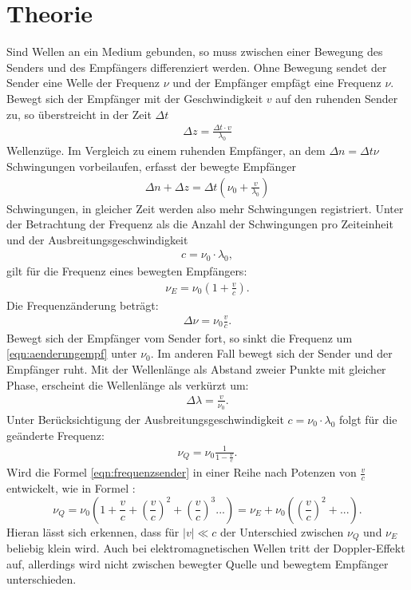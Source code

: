\section{Theorie}
\label{sec:Theorie}
Sind Wellen an ein Medium gebunden,
so muss zwischen einer Bewegung des Senders und des Empfängers differenziert werden.
Ohne Bewegung sendet der Sender eine Welle der Frequenz $\nu$ und der Empfänger
empfägt eine Frequenz $\nu$.
Bewegt sich der Empfänger mit der Geschwindigkeit $v$ auf den ruhenden Sender zu,
so überstreicht in der Zeit $\Delta t$
\begin{align}
  \Delta z=\frac{\Delta t\cdot v}{\lambda_0}
\end{align}
Wellenzüge.
Im Vergleich zu einem ruhenden Empfänger, an dem $\Delta n= \Delta t\nu$ Schwingungen
vorbeilaufen, erfasst der bewegte Empfänger
\begin{align}
  \Delta n + \Delta z = \Delta t \left(\nu_0 +\frac{v}{\lambda_0}\right)
\end{align}
Schwingungen, in gleicher Zeit werden also mehr Schwingungen registriert.
Unter der Betrachtung der Frequenz als die Anzahl der Schwingungen pro
Zeiteinheit und der Ausbreitungsgeschwindigkeit
\begin{align}
c=\nu_0\cdot\lambda_0 \label{eqn:c},
\end{align}
gilt für die Frequenz eines bewegten Empfängers:
\begin{align}
  \nu_E=\nu_0\left(1+\frac{v}{c}\right)\label{eqn:frequenzempf}.
\end{align}
Die Frequenzänderung beträgt:
\begin{align}
  \Delta\nu=\nu_0\frac{v}{c}\label{eqn:aenderungempf}.
\end{align}
Bewegt sich der Empfänger vom Sender fort, so sinkt die Frequenz um \eqref{eqn:aenderungempf}
unter $\nu_0$.
Im anderen Fall bewegt sich der Sender und der Empfänger ruht.
Mit der Wellenlänge als Abstand zweier Punkte mit gleicher Phase, erscheint
die Wellenlänge als verkürzt um:
\begin{align}
  \Delta\lambda=\frac{v}{\nu_0}.
\end{align}
Unter Berücksichtigung der Ausbreitungsgeschwindigkeit $c=\nu_0\cdot\lambda_0$
folgt für die geänderte Frequenz:
\begin{align}
  \nu_Q=\nu_0\frac{1}{1-\frac{v}{c}}\label{eqn:frequenzsender}.
\end{align}
Wird die Formel \eqref{eqn:frequenzsender} in einer Reihe nach Potenzen von $\frac{v}{c}$
entwickelt, wie in Formel :
\begin{equation}
  \nu_Q=\nu_0\left(1+\frac{v}{c}+\left(\frac{v}{c} \right)^2+\left(\frac{v}{c}\right)^3...\right)= \nu_E +\nu_0\left(\left(\frac{v}{c}\right)^2+...\right).
\end{equation}
Hieran lässt sich erkennen, dass für $\lvert v \rvert \ll c$ der Unterschied zwischen
$\nu_Q$ und $\nu_E$ beliebig klein wird.
Auch bei elektromagnetischen Wellen tritt der Doppler-Effekt
auf, allerdings wird nicht zwischen bewegter Quelle und bewegtem Empfänger unterschieden.
